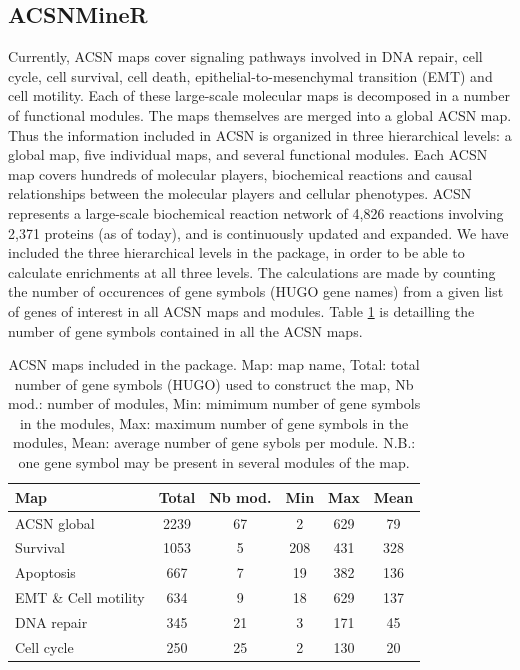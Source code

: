 \subsection{ACSNMineR}
Currently, ACSN maps cover signaling pathways involved in DNA repair, cell
cycle, cell survival, cell death, epithelial-to-mesenchymal transition (EMT) and
cell motility. Each of these large-scale molecular maps is decomposed in a number
of functional modules. The maps themselves are merged into a global ACSN map.
Thus the information included in ACSN is organized in three hierarchical levels:
a global map, five individual maps, and several functional modules. Each
ACSN map covers hundreds of molecular players, biochemical reactions and causal
relationships between the molecular players and cellular phenotypes.  ACSN
represents a large-scale biochemical reaction network of 4,826 reactions
involving 2,371 proteins (as of today), and is continuously updated and expanded.  We have
included the three hierarchical levels in the  package, in order
to be able to calculate enrichments at all three levels. The calculations are
made by counting the number of occurences of gene symbols (HUGO gene names) from
a given list of genes of interest in all ACSN maps and modules. Table
\ref{tab:table1} is detailling the number of gene symbols contained in all the ACSN
maps.


\begin{table}[h!]
 \centering
  \caption{ACSN maps included in the  package. Map: map name,
  Total: total number of gene symbols (HUGO) used to construct the map, Nb
  mod.: number of modules, Min: mimimum number of gene symbols in the modules,
  Max: maximum number of gene symbols in the modules, Mean: average number of
  gene sybols per module. N.B.: one gene symbol may be present in several
  modules of the map.} \label{tab:table1}
  \begin{tabular}{l c c c c c}
    \toprule
    Map & Total & Nb mod. & Min & Max & Mean\\
    \midrule
  ACSN global & 2239 & 67 & 2 &629& 79\\
  Survival  &1053&5  &208 &431 &328\\
  Apoptosis & 667&7 & 19& 382& 136\\
  EMT \& Cell motility &634 &9  &18 &629 &137\\
  DNA repair &345&21  &3 &171  &45\\
  Cell cycle &250&25  &2 &130  &20\\
  \bottomrule

  \end{tabular}

\end{table}


